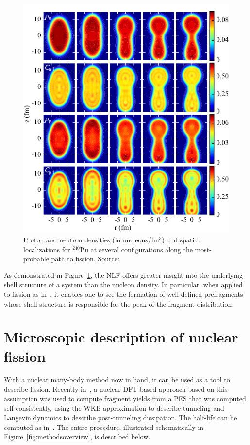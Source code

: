 \begin{figure}
	\centering
	\includegraphics[width=0.5\linewidth]{TeX_files/methods_locali}
	\caption[Proton and neutron densities (in nucleons/fm$^3$) and spatial localizations for $^{240}$Pu at several configurations along the most-probable path to fission.]{Proton and neutron densities (in nucleons/fm$^3$) and spatial localizations for $^{240}$Pu at several configurations along the most-probable path to fission. Source:~\cite{Zhang2016}}
	\label{fig:methodslocali}
\end{figure}

As demonstrated in Figure~\ref{fig:methodslocali}, the NLF offers greater insight into the underlying shell structure of a system than the nucleon density. In particular, when applied to fission as in~\cite{Sadhukhan2017}, it enables one to see the formation of well-defined prefragments whose shell structure is responsible for the peak of the fragment distribution.


\section{Microscopic description of nuclear fission}
With a nuclear many-body method now in hand, it can be used as a tool to describe fission. Recently in~\cite{Sadhukhan2016}, a nuclear DFT-based approach based on this assumption was used to compute fragment yields from a PES that was computed self-consistently, using the WKB approximation to describe tunneling and Langevin dynamics to describe post-tunneling dissipation. The half-life can be computed as in~\cite{Sadhukhan2013}. The entire procedure, illustrated schematically in Figure~\ref{fig:methodsoverview}, is described below.

